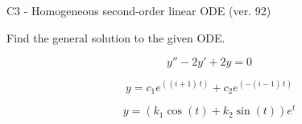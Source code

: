 \begin{exercise}
  \begin{exerciseTitle}C3 - Homogeneous second-order linear ODE (ver. 92)\end{exerciseTitle}
  \begin{exerciseStatement}
    
Find the general solution to the given ODE.

    
\[y''-2y'+2y = 0\]

  \end{exerciseStatement}
  \begin{exerciseAnswer}
    
\[y= c_{1} e^{\left(\left(i + 1\right) \, t\right)} + c_{2} e^{\left(-\left(i - 1\right) \, t\right)}\]

    
\[y= {\left(k_{1} \cos\left(t\right) + k_{2} \sin\left(t\right)\right)} e^{t}\]

  \end{exerciseAnswer}
\end{exercise}